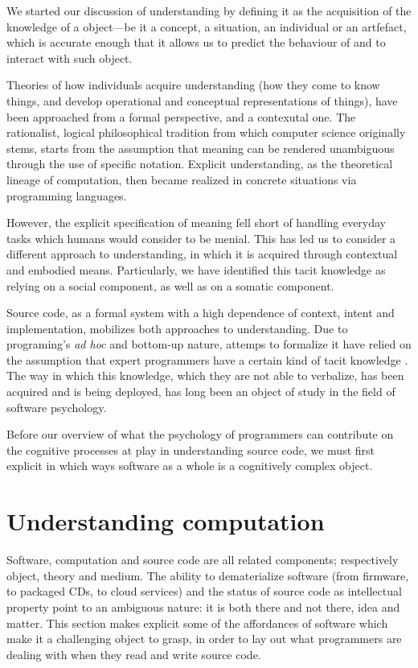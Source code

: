 \spacersmall

We started our discussion of understanding by defining it as the acquisition of the knowledge of a object—be it a concept, a situation, an individual or an artfefact, which is accurate enough that it allows us to predict the behaviour of and to interact with such object.

Theories of how individuals acquire understanding (how they come to know things, and develop operational and conceptual representations of things), have been approached from a formal perspective, and a contexutal one. The rationalist, logical philosophical tradition from which computer science originally stems, starts from the assumption that meaning can be rendered unambiguous through the use of specific notation. Explicit understanding, as the theoretical lineage of computation, then became realized in concrete situations via programming languages.

However, the explicit specification of meaning fell short of handling everyday tasks which humans would consider to be menial. This has led us to consider a different approach to understanding, in which it is acquired through contextual and embodied means. Particularly, we have identified this tacit knowledge as relying on a social component, as well as on a somatic component.

Source code, as a formal system with a high dependence of context, intent and implementation, mobilizes both approaches to understanding. Due to programing's \emph{ad hoc} and bottom-up nature, attemps to formalize it have relied on the assumption that expert programmers have a certain kind of tacit knowledge \citep{soloway1982tapping,soloway_empirical_1984}. The way in which this knowledge, which they are not able to verbalize, has been acquired and is being deployed, has long been an object of study in the field of software psychology.

Before our overview of what the psychology of programmers can contribute on the cognitive processes at play in understanding source code, we must first explicit in which ways software as a whole is a cognitively complex object.

\section{Understanding computation}
\label{sec:understanding-computation}

Software, computation and source code are all related components; respectively object, theory and medium. The ability to dematerialize software (from firmware, to packaged CDs, to cloud services) and the status of source code as intellectual property point to an ambiguous nature: it is both there and not there, idea and matter. This section makes explicit some of the affordances of software which make it a challenging object to grasp, in order to lay out what programmers are dealing with when they read and write source code.

